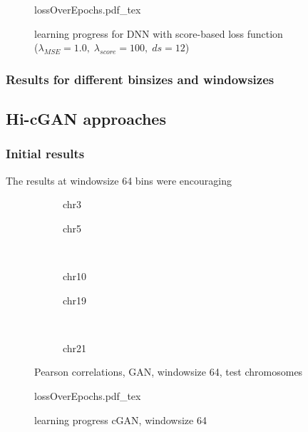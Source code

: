 \begin{figure}[hbp]
 \centering
 \scriptsize
 {lossOverEpochs.pdf_tex}
 \caption{learning progress for DNN with score-based loss function\\ ($\lambda_\mathit{MSE}=1.0,\; \lambda_\mathit{score}=100,\; ds=12$)} \label{fig:results:scoreLossDNN_lossEpochs}
\end{figure}

\subsubsection{Results for different binsizes and windowsizes} \label{sec:results:binsize_winsize}

\subsection{Hi-cGAN approaches} \label{sec:results:cgan}
\subsubsection{Initial results}
The results at windowsize 64 bins were encouraging \xxx
\begin{figure}[p]
    \begin{subfigure}{0.45\textwidth}
        \scriptsize
        \caption{chr3}
    \end{subfigure} \hfill
    \begin{subfigure}{0.45\textwidth}
        \scriptsize
        \caption{chr5}
    \end{subfigure}\\[5mm]
    \begin{subfigure}{0.45\textwidth}
        \scriptsize
        \caption{chr10}
    \end{subfigure}\hfill
    \begin{subfigure}{0.45\textwidth}
        \scriptsize
        \caption{chr19}
    \end{subfigure}\\[3mm]
    \centering
    \begin{subfigure}{0.45\textwidth}
        \scriptsize
        \caption{chr21}
    \end{subfigure}
    \caption{Pearson correlations, GAN, windowsize 64, test chromosomes}
    \label{fig:results:GAN64_pearson}
\end{figure}
\begin{figure}[hbp]
 \centering
 \scriptsize
 {lossOverEpochs.pdf_tex}
 \caption{learning progress cGAN, windowsize 64} \label{fig:results:GAN64_lossEpochs}
\end{figure}

